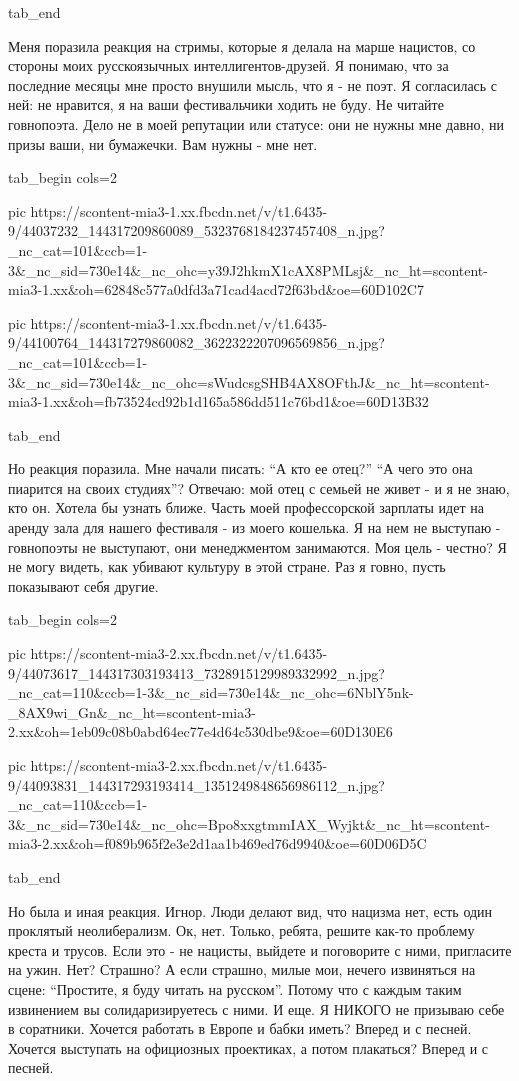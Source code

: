   tab_end
\fi


Меня поразила реакция на стримы, которые я делала на марше нацистов, со стороны
моих русскоязычных интеллигентов-друзей. Я понимаю, что за последние месяцы мне
просто внушили мысль, что я - не поэт. Я согласилась с ней: не нравится, я на
ваши фестивальчики ходить не буду. Не читайте говнопоэта. Дело не в моей
репутации или статусе: они не нужны мне давно, ни призы ваши, ни бумажечки. Вам
нужны - мне нет. 

\ifcmt
  tab_begin cols=2

    pic https://scontent-mia3-1.xx.fbcdn.net/v/t1.6435-9/44037232_144317209860089_5323768184237457408_n.jpg?_nc_cat=101&ccb=1-3&_nc_sid=730e14&_nc_ohc=y39J2hkmX1cAX8PMLsj&_nc_ht=scontent-mia3-1.xx&oh=62848c577a0dfd3a71cad4acd72f63bd&oe=60D102C7

    pic https://scontent-mia3-1.xx.fbcdn.net/v/t1.6435-9/44100764_144317279860082_3622322207096569856_n.jpg?_nc_cat=101&ccb=1-3&_nc_sid=730e14&_nc_ohc=sWudcsgSHB4AX8OFthJ&_nc_ht=scontent-mia3-1.xx&oh=fb73524cd92b1d165a586dd511c76bd1&oe=60D13B32

  tab_end
\fi

Но реакция поразила. Мне начали писать: \enquote{А кто ее отец?} \enquote{А
чего это она пиарится на своих студиях}? Отвечаю: мой отец с семьей не живет -
и я не знаю, кто он. Хотела бы узнать ближе. Часть моей профессорской зарплаты
идет на аренду зала для нашего фестиваля - из моего кошелька. Я на нем не
выступаю - говнопоэты не выступают, они менеджментом занимаются. Моя цель -
честно? Я не могу видеть, как убивают культуру в этой стране. Раз я говно,
пусть показывают себя другие.


\ifcmt
  tab_begin cols=2

     pic https://scontent-mia3-2.xx.fbcdn.net/v/t1.6435-9/44073617_144317303193413_7328915129989332992_n.jpg?_nc_cat=110&ccb=1-3&_nc_sid=730e14&_nc_ohc=6NblY5nk-_8AX9wi_Gn&_nc_ht=scontent-mia3-2.xx&oh=1eb09c08b0abd64ec77e4d64c530dbe9&oe=60D130E6

     pic https://scontent-mia3-2.xx.fbcdn.net/v/t1.6435-9/44093831_144317293193414_1351249848656986112_n.jpg?_nc_cat=110&ccb=1-3&_nc_sid=730e14&_nc_ohc=Bpo8xxgtmmIAX_Wyjkt&_nc_ht=scontent-mia3-2.xx&oh=f089b965f2e3e2d1aa1b469ed76d9940&oe=60D06D5C

  tab_end
\fi


Но была и иная реакция. Игнор. Люди делают вид, что нацизма нет, есть один
проклятый неолиберализм. Ок, нет. Только, ребята, решите как-то проблему креста
и трусов. Если это - не нацисты, выйдете и поговорите с ними, пригласите на
ужин. Нет? Страшно? А если страшно, милые мои, нечего извиняться на сцене:
\enquote{Простите, я буду читать на русском}. Потому что с каждым таким извинением вы
солидаризируетесь с ними. И еще. Я НИКОГО не призываю себе в соратники. Хочется
работать в Европе и бабки иметь? Вперед и с песней. Хочется выступать на
официозных проектиках, а потом плакаться? Вперед и с песней. 

